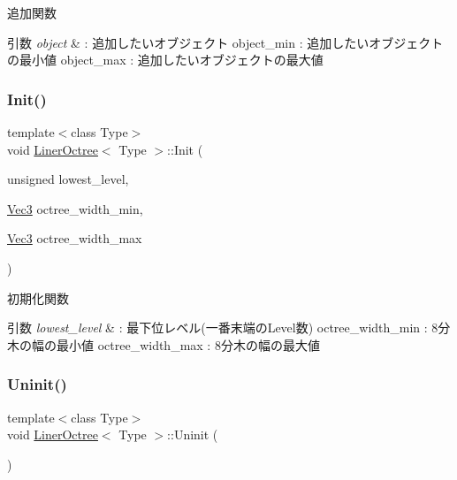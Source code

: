 追加関数 


\begin{DoxyParams}{引数}
{\em object} & \+: 追加したいオブジェクト object\+\_\+min \+: 追加したいオブジェクトの最小値 object\+\_\+max \+: 追加したいオブジェクトの最大値 \\
\hline
\end{DoxyParams}
\mbox{\label{class_liner_octree_a715d655c722c00c002d0bb006d0600d8}} 
\subsubsection{\texorpdfstring{Init()}{Init()}}
{\footnotesize\ttfamily template$<$class Type$>$ \\
void \mbox{\hyperlink{class_liner_octree}{Liner\+Octree}}$<$ Type $>$\+::Init (\begin{DoxyParamCaption}\item[{unsigned}]{lowest\+\_\+level,  }\item[{\mbox{\hyperlink{_vector3_d_8h_ab16f59e4393f29a01ec8b9bbbabbe65d}{Vec3}}}]{octree\+\_\+width\+\_\+min,  }\item[{\mbox{\hyperlink{_vector3_d_8h_ab16f59e4393f29a01ec8b9bbbabbe65d}{Vec3}}}]{octree\+\_\+width\+\_\+max }\end{DoxyParamCaption})\hspace{0.3cm}{\ttfamily [inline]}}



初期化関数 


\begin{DoxyParams}{引数}
{\em lowest\+\_\+level} & \+: 最下位レベル(一番末端の\+Level数) octree\+\_\+width\+\_\+min \+: 8分木の幅の最小値 octree\+\_\+width\+\_\+max \+: 8分木の幅の最大値 \\
\hline
\end{DoxyParams}
\mbox{\label{class_liner_octree_a86b5b9bc86630644e84508ff385cda69}} 
\subsubsection{\texorpdfstring{Uninit()}{Uninit()}}
{\footnotesize\ttfamily template$<$class Type$>$ \\
void \mbox{\hyperlink{class_liner_octree}{Liner\+Octree}}$<$ Type $>$\+::Uninit (\begin{DoxyParamCaption}{ }\end{DoxyParamCaption})\hspace{0.3cm}{\ttfamily [inline]}}



